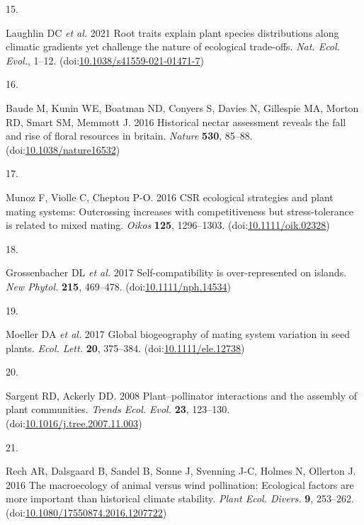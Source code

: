 \documentclass[
  12pt,
  a4paper,
]{article}
\newlength{\cslhangindent}
\newlength{\csllabelwidth}
\newlength{\cslentryspacingunit} %
\newenvironment{CSLReferences}[2] %
 {%
  \setlength{\parindent}{0pt}
  \ifodd #1
  \let\oldpar\par
  \def\par{\hangindent=\cslhangindent\oldpar}
  \fi
  \setlength{\parskip}{#2\cslentryspacingunit}
 }%
 {}
\newcommand{\CSLLeftMargin}[1]{\parbox[t]{\csllabelwidth}{#1}}
\newcommand{\CSLRightInline}[1]{\parbox[t]{\linewidth - \csllabelwidth}{#1}\break}
\begin{document}
\begin{CSLReferences}{0}{0}
\leavevmode{}%
\CSLLeftMargin{15. }
\CSLRightInline{Laughlin DC \emph{et al.} 2021 Root traits explain plant species distributions along climatic gradients yet challenge the nature of ecological trade-offs. \emph{Nat. Ecol. Evol.}, 1--12. (doi:\href{https://doi.org/10.1038/s41559-021-01471-7}{10.1038/s41559-021-01471-7})}

\leavevmode{}%
\CSLLeftMargin{16. }
\CSLRightInline{Baude M, Kunin WE, Boatman ND, Conyers S, Davies N, Gillespie MA, Morton RD, Smart SM, Memmott J. 2016 Historical nectar assessment reveals the fall and rise of floral resources in britain. \emph{Nature} \textbf{530}, 85--88. (doi:\href{https://doi.org/10.1038/nature16532}{10.1038/nature16532})}

\leavevmode{}%
\CSLLeftMargin{17. }
\CSLRightInline{Munoz F, Violle C, Cheptou P-O. 2016 {CSR} ecological strategies and plant mating systems: Outcrossing increases with competitiveness but stress-tolerance is related to mixed mating. \emph{Oikos} \textbf{125}, 1296--1303. (doi:\href{https://doi.org/10.1111/oik.02328}{10.1111/oik.02328})}

\leavevmode{}%
\CSLLeftMargin{18. }
\CSLRightInline{Grossenbacher DL \emph{et al.} 2017 Self-compatibility is over-represented on islands. \emph{New Phytol.} \textbf{215}, 469--478. (doi:\href{https://doi.org/10.1111/nph.14534}{10.1111/nph.14534})}

\leavevmode{}%
\CSLLeftMargin{19. }
\CSLRightInline{Moeller DA \emph{et al.} 2017 Global biogeography of mating system variation in seed plants. \emph{Ecol. Lett.} \textbf{20}, 375--384. (doi:\href{https://doi.org/10.1111/ele.12738}{10.1111/ele.12738})}

\leavevmode{}%
\CSLLeftMargin{20. }
\CSLRightInline{Sargent RD, Ackerly DD. 2008 Plant--pollinator interactions and the assembly of plant communities. \emph{Trends Ecol. Evol.} \textbf{23}, 123--130. (doi:\href{https://doi.org/10.1016/j.tree.2007.11.003}{10.1016/j.tree.2007.11.003})}

\leavevmode{}%
\CSLLeftMargin{21. }
\CSLRightInline{Rech AR, Dalsgaard B, Sandel B, Sonne J, Svenning J-C, Holmes N, Ollerton J. 2016 The macroecology of animal versus wind pollination: Ecological factors are more important than historical climate stability. \emph{Plant Ecol. Divers.} \textbf{9}, 253--262. (doi:\href{https://doi.org/10.1080/17550874.2016.1207722}{10.1080/17550874.2016.1207722})}


\end{CSLReferences}
\end{document}
